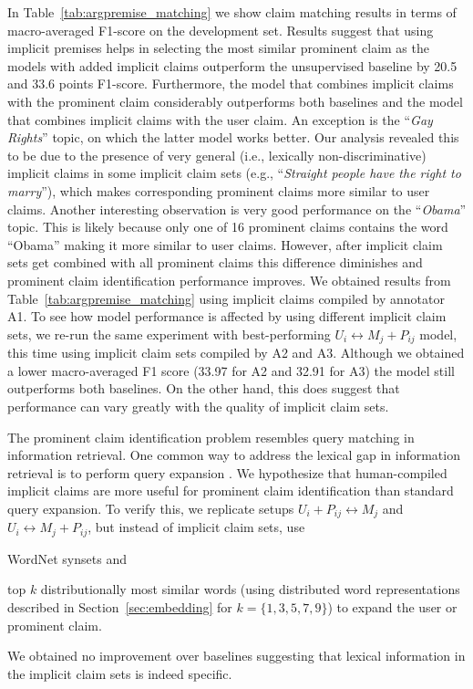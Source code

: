 In Table~\ref{tab:argpremise_matching} we show claim matching results in terms of
macro-averaged F1-score on the development set. 
Results suggest that using implicit premises helps in selecting the most similar prominent claim 
as the models with added implicit claims outperform the unsupervised baseline by
20.5 and 33.6 points F1-score. 
Furthermore, the model that combines implicit claims with the prominent claim considerably 
outperforms both baselines and the model that combines implicit claims with the user claim. 
An exception is the ``\emph{Gay Rights}'' topic, on which the latter model works better. 
Our analysis revealed this to be due to the presence of very general 
(i.e., lexically non-discriminative) implicit claims in some implicit claim sets 
(e.g., ``\emph{Straight people
have the right to marry}''), which makes corresponding prominent claims more similar to
user claims. 
Another interesting observation is very good performance on the ``\emph{Obama}'' topic. 
This is likely because only one of 16 prominent claims contains the word ``Obama''
making it more similar to user claims. 
However, after implicit claim sets get combined with all prominent claims this
difference diminishes and prominent claim identification performance improves. 
We obtained results from Table~\ref{tab:argpremise_matching} using implicit claims compiled by
annotator A1. 
To see how model performance is affected by using different implicit claim
sets, we re-run the same experiment with best-performing $U_i \leftrightarrow
M_j + P_{ij}$ model, this time using implicit claim sets compiled by A2 and A3. 
Although we obtained a lower macro-averaged F1 score (33.97 for A2 and 32.91 for A3) the model 
still outperforms both baselines. 
On the other hand, this does suggest that performance can vary greatly with the quality of 
implicit claim sets. 


The prominent claim identification problem resembles query matching in
information retrieval. 
One common way to address the lexical gap in information retrieval is to perform
query expansion \citep{voorhees1994query}. 
We hypothesize that human-compiled implicit claims are more useful for prominent claim
identification than standard
query expansion. 
To verify this, we replicate setups $U_i + P_{ij} \leftrightarrow M_j$ and
$U_i \leftrightarrow M_j + P_{ij}$, but instead of implicit claim sets, use
\begin{enumerate*}[label=(\arabic*)]
\item WordNet \citep{miller1995wordnet} synsets and
\item top $k$ distributionally most similar words (using distributed
word representations described in Section~\ref{sec:embedding} for $k=\{1, 3, 5, 7, 9\}$) to
expand the user or prominent claim.
\end{enumerate*}
We obtained no improvement over baselines suggesting that lexical information 
in the implicit claim sets is indeed specific. 

